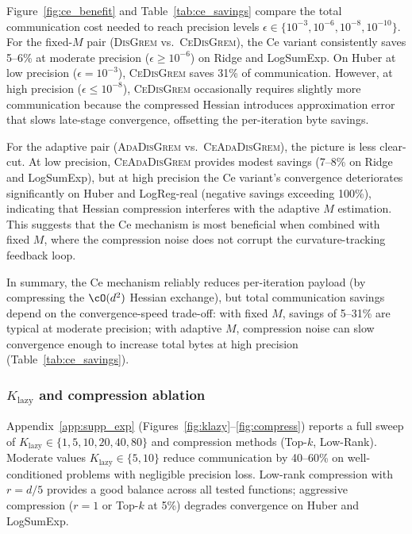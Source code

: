 \documentclass[review,onefignum,onetabnum]{siamart171218}
\begin{document}
	Figure~\ref{fig:ce_benefit} and Table~\ref{tab:ce_savings} compare
	the total communication cost needed to reach precision levels $\epsilon\in\{10^{-3},10^{-6},10^{-8},10^{-10}\}$.
	For the fixed-$M$ pair (\textsc{DisGrem} vs.\ \textsc{CeDisGrem}), the Ce variant
	consistently saves 5--6\% at moderate precision ($\epsilon \ge 10^{-6}$)
	on Ridge and LogSumExp.
	On Huber at low precision ($\epsilon{=}10^{-3}$), \textsc{CeDisGrem} saves
	31\% of communication.
	However, at high precision ($\epsilon \le 10^{-8}$), \textsc{CeDisGrem}
	occasionally requires slightly more communication because the
	compressed Hessian introduces approximation error that slows late-stage
	convergence, offsetting the per-iteration byte savings.
	
	For the adaptive pair (\textsc{AdaDisGrem} vs.\ \textsc{CeAdaDisGrem}), the picture is
	less clear-cut.
	At low precision, \textsc{CeAdaDisGrem} provides modest savings (7--8\% on
	Ridge and LogSumExp), but at high precision the Ce variant's
	convergence deteriorates significantly on Huber and LogReg-real
	(negative savings exceeding 100\%), indicating that Hessian
	compression interferes with the adaptive $M$ estimation.
	This suggests that the Ce mechanism is most beneficial when combined
	with fixed $M$, where the compression noise does not corrupt the
	curvature-tracking feedback loop.

	In summary, the Ce mechanism reliably reduces
	per-iteration payload (by compressing the $\cO(d^2)$
	Hessian exchange), but total communication savings depend on
	the convergence-speed trade-off: with fixed $M$, savings of
	5--31\% are typical at moderate precision; with adaptive $M$,
	compression noise can slow convergence enough to increase
	total bytes at high precision (Table~\ref{tab:ce_savings}).

	\subsubsection{$K_{\mathrm{lazy}}$ and compression ablation}

	Appendix~\ref{app:supp_exp} (Figures~\ref{fig:klazy}--\ref{fig:compress})
	reports a full sweep of $K_{\mathrm{lazy}}\in\{1,5,10,20,40,80\}$
	and compression methods (Top-$k$, Low-Rank).
	Moderate values $K_{\mathrm{lazy}}\in\{5,10\}$ reduce
	communication by 40--60\% on well-conditioned problems with
	negligible precision loss.
	Low-rank compression with $r{=}d/5$ provides a good balance
	across all tested functions; aggressive compression ($r{=}1$ or
	Top-$k$ at 5\%) degrades convergence on Huber and LogSumExp.
	
\end{document}
